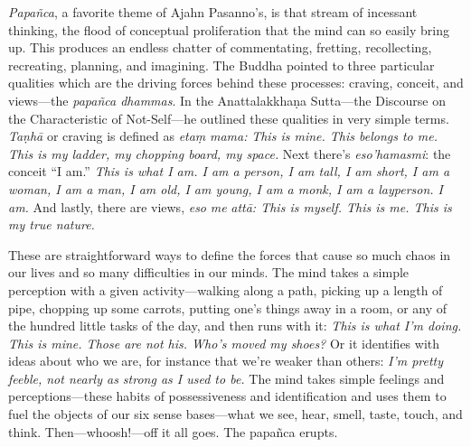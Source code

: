 
\emph{Papañca}, a favorite theme of Ajahn Pasanno's, is that stream of 
incessant thinking, the flood of conceptual proliferation that the mind 
can so easily bring up. This produces an endless chatter of 
commentating, fretting, recollecting, recreating, planning, and 
imagining. The Buddha pointed to three particular qualities which are 
the driving forces behind these processes: craving, conceit, and 
views---the \emph{papañca dhammas}. In the Anattalakkhaṇa 
Sutta---the Discourse on the Characteristic of Not-Self---he outlined 
these qualities in very simple terms. \emph{Taṇhā} or craving is 
defined as \emph{etaṃ} \emph{mama:} \emph{This is mine. This belongs 
to me. This is my ladder, my chopping board, my space.} Next there's 
\emph{eso'hamasmi}: the conceit ``I am.'' \emph{This is what I am. I am 
a person, I am tall, I am short, I am a woman, I am a man, I am old, I 
am young, I am a monk, I am a layperson. I am.} And lastly, there are 
views, \emph{eso} \emph{me} \emph{attā: This is myself. This is me. 
This is my true nature.}

These are straightforward ways to define the forces that cause so much 
chaos in our lives and so many difficulties in our minds. The mind 
takes a simple perception with a given activity---walking along a path, 
picking up a length of pipe, chopping up some carrots, putting one's 
things away in a room, or any of the hundred little tasks of the day, 
and then runs with it: \emph{This is what I'm doing. This is mine. 
Those are not his. Who's moved my shoes?} Or it identifies with ideas 
about who we are, for instance that we're weaker than others: \emph{I'm 
pretty feeble, not nearly as strong as I used to be.} The mind takes 
simple feelings and perceptions---these habits of possessiveness and 
identification and uses them to fuel the objects of our six sense 
bases---what we see, hear, smell, taste, touch, and think. 
Then---whoosh!---off it all goes. The papañca erupts.

